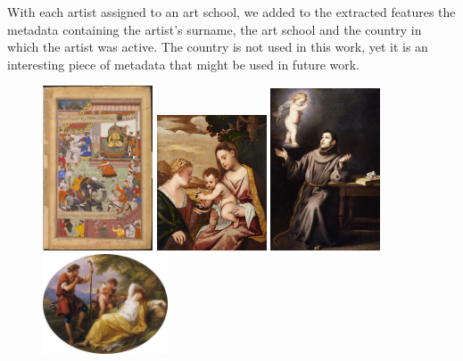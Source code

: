 \documentclass[11pt,a4paper,twoside,openright,draft]{report}
\begin{document}
\begin{multicols}{2}
With each artist assigned to an art school, we added to the extracted features
the metadata containing the artist's surname, the art school and the country in
which the artist was active.  The country is not used in this work, yet it is
an interesting piece of metadata that might be used in future work.

\begin{figure}[tbp]
\centering
\includegraphics[width=0.29\textwidth]{basawan_2009BX3686}
\includegraphics[width=0.29\textwidth]{titian_eu_741}
\includegraphics[width=0.29\textwidth]{murillo_1974p24}
\includegraphics[width=0.33\textwidth]{kauffmann_va_pc_2006an1773}

\end{figure}
\end{multicols}
\end{document}
